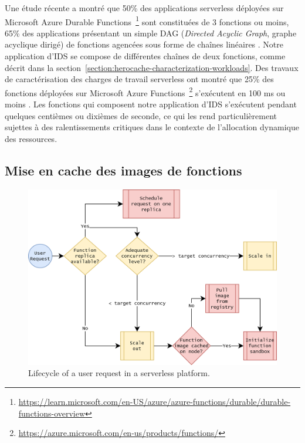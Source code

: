 Une étude récente a montré que 50\% des applications serverless déployées sur Microsoft Azure Durable Functions~\footnote{\href{https://learn.microsoft.com/en-US/azure/azure-functions/durable/durable-functions-overview}{https://learn.microsoft.com/en-US/azure/azure-functions/durable/durable-functions-overview}} sont constituées de 3 fonctions ou moins, 65\% des applications présentant un simple DAG (\textit{Directed Acyclic Graph}, graphe acyclique dirigé) de fonctions agencées sous forme de chaînes linéaires \cite{mahgoubORIONThreeRights}. Notre application d'IDS se compose de différentes chaînes de deux fonctions, comme décrit dans la section~\ref{section:herocache-characterization-workloads}. Des travaux de caractérisation des charges de travail serverless ont montré que 25\% des fonctions déployées sur Microsoft Azure Functions~\footnote{\href{https://azure.microsoft.com/en-us/products/functions/}{https://azure.microsoft.com/en-us/products/functions/}} s'exécutent en 100 ms ou moins \cite{shahradServerlessWildCharacterizing}. Les fonctions qui composent notre application d'IDS s'exécutent pendant quelques centièmes ou dixièmes de seconde, ce qui les rend particulièrement sujettes à des ralentissements critiques dans le contexte de l'allocation dynamique des ressources.

\subsection{Mise en cache des images de fonctions}
\label{section:herocache-background-cache}

\begin{figure}[!ht]
    \centering
    \includegraphics[width=0.8\columnwidth]{5_Chapitre5/figures/function-cache.png}
    \caption{Lifecycle of a user request in a serverless platform.}
    \label{figure:herocache-function-cache}
\end{figure}

